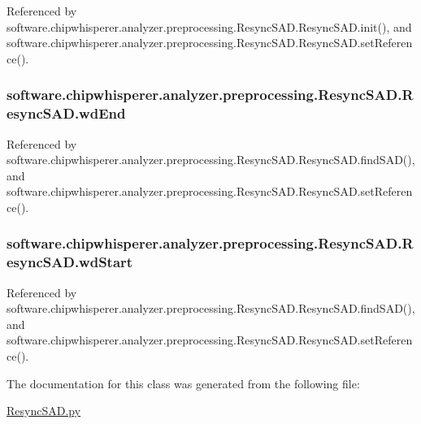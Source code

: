 Referenced by software.\+chipwhisperer.\+analyzer.\+preprocessing.\+Resync\+S\+A\+D.\+Resync\+S\+A\+D.\+init(), and software.\+chipwhisperer.\+analyzer.\+preprocessing.\+Resync\+S\+A\+D.\+Resync\+S\+A\+D.\+set\+Reference().

\hypertarget{classsoftware_1_1chipwhisperer_1_1analyzer_1_1preprocessing_1_1ResyncSAD_1_1ResyncSAD_ace08fd1eb51440d758f7bb7b17fc50ec}{}
\subsubsection[{wd\+End}]{\setlength{\rightskip}{0pt plus 5cm}software.\+chipwhisperer.\+analyzer.\+preprocessing.\+Resync\+S\+A\+D.\+Resync\+S\+A\+D.\+wd\+End}\label{classsoftware_1_1chipwhisperer_1_1analyzer_1_1preprocessing_1_1ResyncSAD_1_1ResyncSAD_ace08fd1eb51440d758f7bb7b17fc50ec}


Referenced by software.\+chipwhisperer.\+analyzer.\+preprocessing.\+Resync\+S\+A\+D.\+Resync\+S\+A\+D.\+find\+S\+A\+D(), and software.\+chipwhisperer.\+analyzer.\+preprocessing.\+Resync\+S\+A\+D.\+Resync\+S\+A\+D.\+set\+Reference().

\hypertarget{classsoftware_1_1chipwhisperer_1_1analyzer_1_1preprocessing_1_1ResyncSAD_1_1ResyncSAD_a1cec6ea723ce69683ef3dea8c464c345}{}
\subsubsection[{wd\+Start}]{\setlength{\rightskip}{0pt plus 5cm}software.\+chipwhisperer.\+analyzer.\+preprocessing.\+Resync\+S\+A\+D.\+Resync\+S\+A\+D.\+wd\+Start}\label{classsoftware_1_1chipwhisperer_1_1analyzer_1_1preprocessing_1_1ResyncSAD_1_1ResyncSAD_a1cec6ea723ce69683ef3dea8c464c345}


Referenced by software.\+chipwhisperer.\+analyzer.\+preprocessing.\+Resync\+S\+A\+D.\+Resync\+S\+A\+D.\+find\+S\+A\+D(), and software.\+chipwhisperer.\+analyzer.\+preprocessing.\+Resync\+S\+A\+D.\+Resync\+S\+A\+D.\+set\+Reference().



The documentation for this class was generated from the following file\+:\begin{DoxyCompactItemize}
\item 
\hyperlink{ResyncSAD_8py}{Resync\+S\+A\+D.\+py}\end{DoxyCompactItemize}
